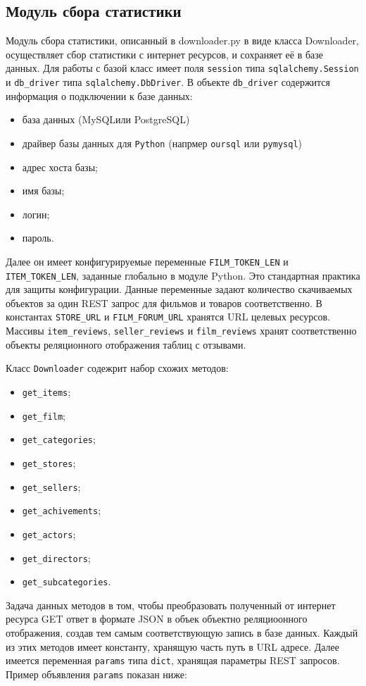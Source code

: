 \subsection{Модуль сбора статистики}
Модуль сбора статистики, описанный в downloader.py в виде класса Downloader, осуществляет сбор статистики с интернет ресурсов, и сохраняет её в базе данных. Для работы с базой класс имеет поля \texttt{session} типа \texttt{sqlalchemy.Session} и \texttt{db\_driver} типа \texttt{sqlalchemy.DbDriver}. В объекте \texttt{db\_driver} содержится информация о подключении к базе данных:
\begin{itemize}
\item база данных (MySQL\@ или PostgreSQL\@)
\item драйвер базы данных для \texttt{Python} (напрмер \texttt{oursql} или \texttt{pymysql})
\item адрес хоста базы;
\item имя базы;
\item логин;
\item пароль.
\end{itemize}
Далее он имеет конфигурируемые переменные \texttt{FILM\_TOKEN\_LEN} и \texttt{ITEM\_TO\-KEN\_LEN}, заданные глобально в модуле Python. Это стандартная практика для защиты конфигурации. Данные переменные задают количество скачиваемых объектов за один REST запрос для фильмов и товаров соответственно. В константах \texttt{STORE\_URL} и \texttt{FILM\_FORUM\_URL} хранятся URL целевых ресурсов. Массивы \texttt{item\_reviews}, \texttt{seller\_reviews} и \texttt{film\_reviews} хранят соответственно объекты реляционного отображения таблиц с отзывами.

Класс \texttt{Downloader} содежрит набор схожих методов:
\begin{itemize}
\item \texttt{get\_items};
\item \texttt{get\_film};
\item \texttt{get\_categories};
\item \texttt{get\_stores};
\item \texttt{get\_sellers};
\item \texttt{get\_achivements};
\item \texttt{get\_actors};
\item \texttt{get\_directors};
\item \texttt{get\_subcategories}.
\end{itemize}

Задача данных методов в том, чтобы преобразовать полученный от интернет ресурса GET ответ в формате JSON в объек объектно реляциоонного отображения, создав тем самым соответствующую запись в базе данных. Каждый из этих методов имеет константу, хранящую часть путь в URL адресе. Далее имеется переменная {\texttt{params}} типа \texttt{dict}, хранящая параметры REST запросов. Пример объявления \texttt{params} показан ниже:

